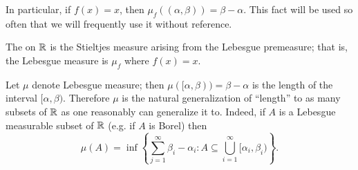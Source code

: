 \begin{subsec}
In particular, if $f(x) = x$, then $\mu_f((\alpha, \beta)) = \beta - \alpha$.
This fact will be used so often that we will frequently use it without reference.
\end{subsec}

\begin{definition}
The  on $\mathbb{R}$ is the Stieltjes measure arising from the Lebesgue premeasure; that is, the Lebesgue measure is $\mu_f$ where $f(x) = x$.
\end{definition}

\begin{subsec}
Let $\mu$ denote Lebesgue measure; then $\mu([\alpha, \beta)) = \beta - \alpha$ is the length of the interval $[\alpha, \beta)$.
Therefore $\mu$ is the natural generalization of ``length'' to as many subsets of $\mathbb{R}$ as one reasonably can generalize it to.
Indeed, if $A$ is a Lebesgue measurable subset of $\mathbb{R}$ (e.g. if $A$ is Borel) then
\begin{equation}\label{lebesgue measure formula}
\mu(A) = \inf \left\{\sum_{j=1}^{\infty} \beta_{i} - \alpha_i: A \subseteq \bigcup_{i=1}^{\infty} [\alpha_i, \beta_i)\right\}.
\end{equation}
\end{subsec}

